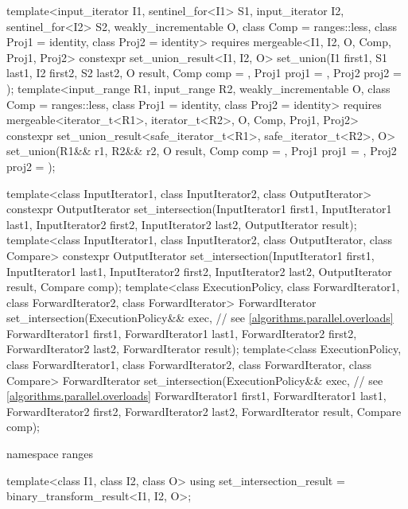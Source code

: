 \begin{codeblock}
{{    template<input_iterator I1, sentinel_for<I1> S1, input_iterator I2, sentinel_for<I2> S2,
             weakly_incrementable O, class Comp = ranges::less,
             class Proj1 = identity, class Proj2 = identity>
      requires mergeable<I1, I2, O, Comp, Proj1, Proj2>
      constexpr set_union_result<I1, I2, O>
        set_union(I1 first1, S1 last1, I2 first2, S2 last2, O result, Comp comp = {},
                  Proj1 proj1 = {}, Proj2 proj2 = {});
    template<input_range R1, input_range R2, weakly_incrementable O,
             class Comp = ranges::less, class Proj1 = identity, class Proj2 = identity>
      requires mergeable<iterator_t<R1>, iterator_t<R2>, O, Comp, Proj1, Proj2>
      constexpr set_union_result<safe_iterator_t<R1>, safe_iterator_t<R2>, O>
        set_union(R1&& r1, R2&& r2, O result, Comp comp = {},
                  Proj1 proj1 = {}, Proj2 proj2 = {});
  }

  template<class InputIterator1, class InputIterator2, class OutputIterator>
    constexpr OutputIterator
      set_intersection(InputIterator1 first1, InputIterator1 last1,
                       InputIterator2 first2, InputIterator2 last2,
                       OutputIterator result);
  template<class InputIterator1, class InputIterator2, class OutputIterator, class Compare>
    constexpr OutputIterator
      set_intersection(InputIterator1 first1, InputIterator1 last1,
                       InputIterator2 first2, InputIterator2 last2,
                       OutputIterator result, Compare comp);
  template<class ExecutionPolicy, class ForwardIterator1, class ForwardIterator2,
           class ForwardIterator>
    ForwardIterator
      set_intersection(ExecutionPolicy&& exec,                  // see \ref{algorithms.parallel.overloads}
                       ForwardIterator1 first1, ForwardIterator1 last1,
                       ForwardIterator2 first2, ForwardIterator2 last2,
                       ForwardIterator result);
  template<class ExecutionPolicy, class ForwardIterator1, class ForwardIterator2,
           class ForwardIterator, class Compare>
    ForwardIterator
      set_intersection(ExecutionPolicy&& exec,                  // see \ref{algorithms.parallel.overloads}
                       ForwardIterator1 first1, ForwardIterator1 last1,
                       ForwardIterator2 first2, ForwardIterator2 last2,
                       ForwardIterator result, Compare comp);

  namespace ranges {
    template<class I1, class I2, class O>
    using set_intersection_result = binary_transform_result<I1, I2, O>;

}}
\end{codeblock}
